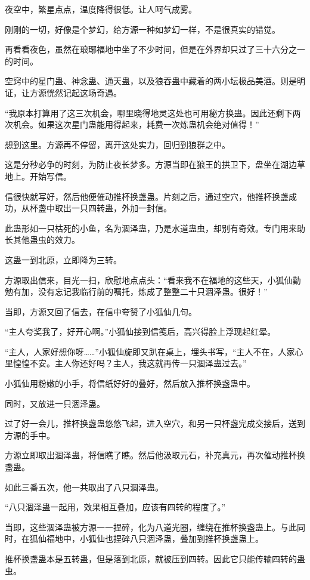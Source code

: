 \begin{this_body}
夜空中，繁星点点，温度降得很低。让人呵气成雾。

刚刚的一切，好像是个梦幻，给方源一种如梦幻一样，不是很真实的错觉。

再看看夜色，虽然在琅琊福地中坐了不少时间，但是在外界却只过了三十六分之一的时间。

空窍中的星门蛊、神念蛊、通天蛊，以及狼吞蛊中藏着的两小坛极品美酒。则是明证，让方源恍然记起这场奇遇。

“我原本打算用了这三次机会，哪里晓得地灵这处也可用秘方换蛊。因此还剩下两次机会。如果这次星门蛊能用得起来，耗费一次炼蛊机会绝对值得！”

想到这里。方源再不停留，离开这处实力，回归到狼群之中。

这是分秒必争的时刻，为防止夜长梦多。方源当即在狼王的拱卫下，盘坐在湖边草地上。开始写信。

信很快就写好，然后他便催动推杯换盏蛊。片刻之后，通过空穴，他推杯换盏成功，从杯盏中取出一只四转蛊，外加一封信。

此蛊形如一只枯死的小鱼，名为涸泽蛊，乃是水道蛊虫，却别有奇效。专门用来助长其他蛊虫的效力。

这蛊一到北原，立即降为三转。

方源取出信来，目光一扫，欣慰地点点头：“看来我不在福地的这些天，小狐仙勤勉有加，没有忘记我临行前的嘱托，炼成了整整二十只涸泽蛊。很好！”

当即，方源又回了信去，在信中夸赞了小狐仙几句。

“主人夸奖我了，好开心啊。”小狐仙接到信笺后，高兴得脸上浮现起红晕。

“主人，人家好想你呀……”小狐仙旋即又趴在桌上，埋头书写，“主人不在，人家心里惶惶不安。主人你还好吗？主人，我这就再传一只涸泽蛊过去。”

小狐仙用粉嫩的小手，将信纸好好的叠好，然后放入推杯换盏蛊中。

同时，又放进一只涸泽蛊。

过了好一会儿，推杯换盏蛊悠悠飞起，进入空穴，和另一只杯盏完成交接后，送到方源的手中。

方源立即取出涸泽蛊，将信瞧了瞧。然后他汲取元石，补充真元，再次催动推杯换盏蛊。

如此三番五次，他一共取出了八只涸泽蛊。

“八只涸泽蛊一起用，效果相互叠加，应该有四转的程度了。”

当即，这些涸泽蛊被方源一一捏碎，化为八道光圈，缠绕在推杯换盏蛊上。与此同时，在狐仙福地中，小狐仙也捏碎八只涸泽蛊，叠加到推杯换盏蛊上。

推杯换盏蛊本是五转蛊，但是落到北原，就被压到四转。因此它只能传输四转的蛊虫。


\end{this_body}
